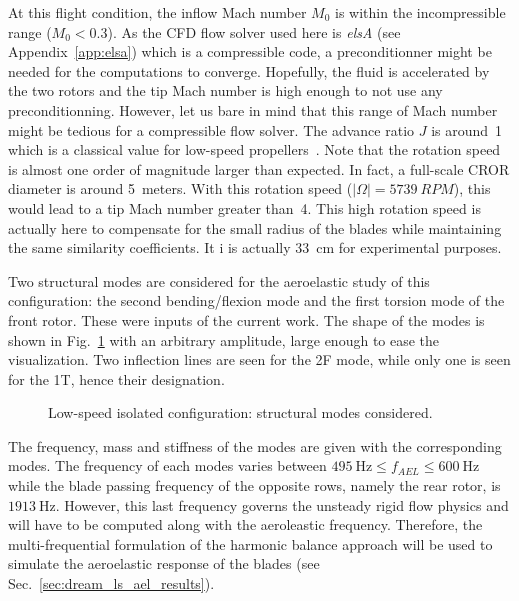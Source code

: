 At this flight condition, the inflow Mach 
number $M_0$ is within the incompressible range
($M_0 < 0.3$). As the CFD flow solver used here is \emph{elsA}
(see Appendix~\ref{app:elsa}) which is a compressible code, 
a preconditionner might be needed for the computations to converge. 
Hopefully, the fluid is accelerated by the two rotors
and the tip Mach number is high enough to not use any preconditionning.
However, let us bare in mind that this range of Mach number might
be tedious for a compressible flow solver.
The advance ratio $J$ is around~1 which is a classical value for
low-speed propellers~\cite{Bousquet2012}. Note that the rotation speed is almost
one order of magnitude larger than expected. 
In fact, a full-scale CROR diameter is around 5~meters. With this rotation speed
($|\Omega|=5739~RPM$),
this would lead to a tip Mach number greater than~4. This high rotation speed is 
actually here to compensate for the small radius of the blades 
while maintaining the same similarity coefficients. It i
is actually 33~cm for experimental purposes.

Two structural modes are considered for the aeroelastic study of this 
configuration: the second bending/flexion mode and the first torsion mode
of the front rotor. These were inputs of the current work.
The shape of the modes is shown in Fig.~\ref{fig:dream_ls_ael_modes}
with an arbitrary amplitude, large enough to ease the visualization.
Two inflection lines are seen for the 2F mode, while only
one is seen for the 1T, hence their designation.
\begin{figure}[htp]
  \centering
  \caption{Low-speed isolated configuration: structural modes considered.}
  \label{fig:dream_ls_ael_modes}
\end{figure}
The frequency, mass and stiffness of the modes 
are given with the corresponding modes.
The frequency of each modes varies between 
$495~\textrm{Hz} \leq f_{AEL} \leq 600~\textrm{Hz}$
while the blade passing frequency of the opposite rows,
namely the rear rotor, is $1913~\textrm{Hz}$. However,
this last frequency governs the unsteady rigid flow physics 
and will have to be computed along with the aeroleastic frequency.
Therefore, the multi-frequential formulation of the
harmonic balance approach will be used to simulate the
aeroelastic response of the blades (see Sec.~\ref{sec:dream_ls_ael_results}).
